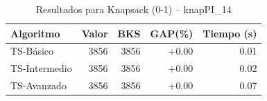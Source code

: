 \begin{table}[h]
\centering
\caption{Resultados para Knapsack (0-1) -- knapPI_14}
\label{tab:knapsack_knapPI_14}
\begin{tabular}{lrrrr}
\hline
\textbf{Algoritmo} & \textbf{Valor} & \textbf{BKS} & \textbf{GAP(\%)} & \textbf{Tiempo (s)} \\
\hline
TS-Básico & 3856 & 3856 & +0.00 & 0.01 \\
TS-Intermedio & 3856 & 3856 & +0.00 & 0.02 \\
TS-Avanzado & 3856 & 3856 & +0.00 & 0.07 \\
\hline
\end{tabular}
\end{table}
